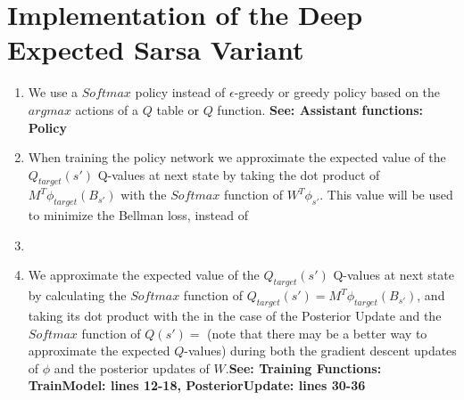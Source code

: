 \documentclass{article}
\begin{document}
\section{Implementation of the Deep Expected Sarsa Variant}
\begin{enumerate}
    \item We use a $Softmax$ policy instead of $\epsilon$-greedy or greedy policy based on the $argmax$ actions of a $Q$ table or $Q$ function. \newline\newline \textbf{See: Assistant functions: Policy}
    \item When training the policy network we approximate the expected value of the $Q_{target}(s')$ Q-values at next state by taking the dot product of $M^T\phi_{target}(B_{s'})$ with the $Softmax$ function of $W^T\phi_{s'}$. This value will be used to minimize the Bellman loss, instead of 
    \item 
    \item We approximate the expected value of the $Q_{target}(s')$ Q-values at next state by calculating the $Softmax$ function of $Q_{target}(s') = M^T\phi_{target}(B_{s'})$, and taking its dot product with the   in the case of the Posterior Update and the $Softmax$ function of $Q(s') = $ (note that there may be a better way to approximate the expected $Q$-values) during both the gradient descent updates of $\phi$ and the posterior updates of $W$.\newline\newline \textbf{See: Training Functions: TrainModel: lines 12-18, PosteriorUpdate: lines 30-36}
\end{enumerate}

\clearpage
\end{document}
